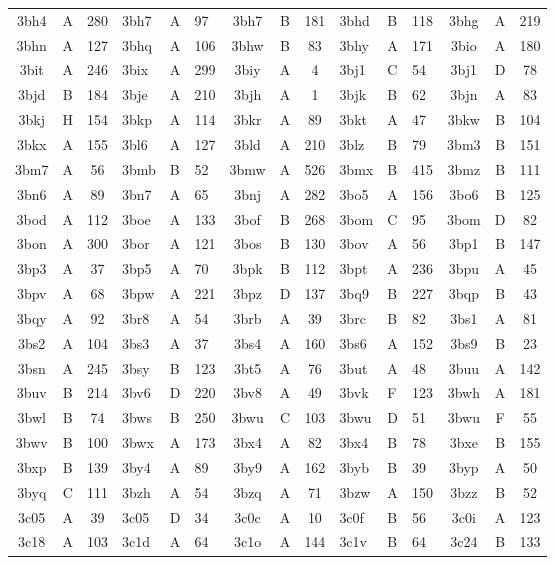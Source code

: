 \begin{longtable}{|c|c|c| a|a|a| c|c|c| a|a|a| c|c|c|}
3bh4 & A & 280 & 3bh7 & A & 97 & 3bh7 & B & 181 & 3bhd & B & 118 & 3bhg & A & 219\\
3bhn & A & 127 & 3bhq & A & 106 & 3bhw & B & 83 & 3bhy & A & 171 & 3bio & A & 180\\
3bit & A & 246 & 3bix & A & 299 & 3biy & A & 4 & 3bj1 & C & 54 & 3bj1 & D & 78\\
3bjd & B & 184 & 3bje & A & 210 & 3bjh & A & 1 & 3bjk & B & 62 & 3bjn & A & 83\\
3bkj & H & 154 & 3bkp & A & 114 & 3bkr & A & 89 & 3bkt & A & 47 & 3bkw & B & 104\\
3bkx & A & 155 & 3bl6 & A & 127 & 3bld & A & 210 & 3blz & B & 79 & 3bm3 & B & 151\\
3bm7 & A & 56 & 3bmb & B & 52 & 3bmw & A & 526 & 3bmx & B & 415 & 3bmz & B & 111\\
3bn6 & A & 89 & 3bn7 & A & 65 & 3bnj & A & 282 & 3bo5 & A & 156 & 3bo6 & B & 125\\
3bod & A & 112 & 3boe & A & 133 & 3bof & B & 268 & 3bom & C & 95 & 3bom & D & 82\\
3bon & A & 300 & 3bor & A & 121 & 3bos & B & 130 & 3bov & A & 56 & 3bp1 & B & 147\\
3bp3 & A & 37 & 3bp5 & A & 70 & 3bpk & B & 112 & 3bpt & A & 236 & 3bpu & A & 45\\
3bpv & A & 68 & 3bpw & A & 221 & 3bpz & D & 137 & 3bq9 & B & 227 & 3bqp & B & 43\\
3bqy & A & 92 & 3br8 & A & 54 & 3brb & A & 39 & 3brc & B & 82 & 3bs1 & A & 81\\
3bs2 & A & 104 & 3bs3 & A & 37 & 3bs4 & A & 160 & 3bs6 & A & 152 & 3bs9 & B & 23\\
3bsn & A & 245 & 3bsy & B & 123 & 3bt5 & A & 76 & 3but & A & 48 & 3buu & A & 142\\
3buv & B & 214 & 3bv6 & D & 220 & 3bv8 & A & 49 & 3bvk & F & 123 & 3bwh & A & 181\\
3bwl & B & 74 & 3bws & B & 250 & 3bwu & C & 103 & 3bwu & D & 51 & 3bwu & F & 55\\
3bwv & B & 100 & 3bwx & A & 173 & 3bx4 & A & 82 & 3bx4 & B & 78 & 3bxe & B & 155\\
3bxp & B & 139 & 3by4 & A & 89 & 3by9 & A & 162 & 3byb & B & 39 & 3byp & A & 50\\
3byq & C & 111 & 3bzh & A & 54 & 3bzq & A & 71 & 3bzw & A & 150 & 3bzz & B & 52\\
3c05 & A & 39 & 3c05 & D & 34 & 3c0c & A & 10 & 3c0f & B & 56 & 3c0i & A & 123\\
3c18 & A & 103 & 3c1d & A & 64 & 3c1o & A & 144 & 3c1v & B & 64 & 3c24 & B & 133\\

\end{longtable}
